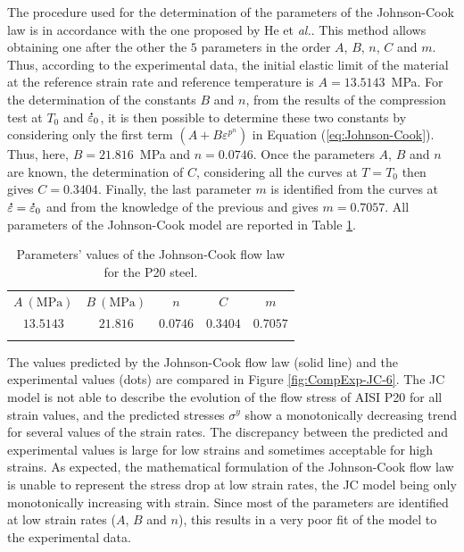 \documentclass[twoside,english,1p,final,sort&compress]{elsarticle}
\makeatletter
\theoremstyle{plain}
\newcommand{\mdot}[1]{\accentset{\mbox{\bfseries .}}{#1}}
\newcommand*{\eal}{et \emph{al.}\@\xspace}
\makeatother
\begin{document}
The procedure used for the determination of the parameters of the Johnson-Cook law is in accordance with the one proposed by He \eal \cite{He-2013}.
This method allows obtaining one after the other the $5$ parameters in the order $A$, $B$, $n$, $C$ and $m$.
Thus, according to the experimental data, the initial elastic limit of the material at the reference strain rate and reference temperature is $A=13.5143$~MPa.
For the determination of the constants $B$ and $n$, from the results of the compression test at $T_0$ and $\mdot\varepsilon_0$, it is then possible to determine these two constants by considering only the first term $\left(A+B\varepsilon^{p^{n}}\right)$ in Equation (\ref{eq:Johnson-Cook}).
Thus, here, $B=21.816$~MPa and $n=0.0746$.
Once the parameters $A$, $B$ and $n$ are known, the determination of $C$, considering all the curves at $T=T_0$ then gives $C=0.3404$.
Finally, the last parameter $m$ is identified from the curves at $\mdot\varepsilon=\mdot\varepsilon_0$ and from the knowledge of the previous and gives $m=0.7057$.
All parameters of the Johnson-Cook model are reported in Table \ref{tab:JC}.

\begin{table}[h!]
\centering
\caption{Parameters' values of the Johnson-Cook flow law for the P20 steel.}
\begin{tabular}{ccccc}
\hline
$A~(\text{MPa})$ & $B~(\text{MPa})$ & $n$ & $C$ & $m$\\
$13.5143$&$21.816$&$0.0746$&$0.3404$&$0.7057$\\ \hline
\label{tab:JC}
\end{tabular}
\end{table}

The values predicted by the Johnson-Cook flow law (solid line) and the experimental values (dots) are compared in Figure \ref{fig:CompExp-JC-6}.
The JC model is not able to describe the evolution of the flow stress of AISI P20 for all strain values, and the predicted stresses $\sigma^y$ show a monotonically decreasing trend for several values of the strain rates.
The discrepancy between the predicted and experimental values is large for low strains and sometimes acceptable for high strains.
As expected, the mathematical formulation of the Johnson-Cook flow law is unable to represent the stress drop at low strain rates, the JC model being only monotonically increasing with strain.
Since most of the parameters are identified at low strain rates ($A$, $B$ and $n$), this results in a very poor fit of the model to the experimental data.
\end{document}
